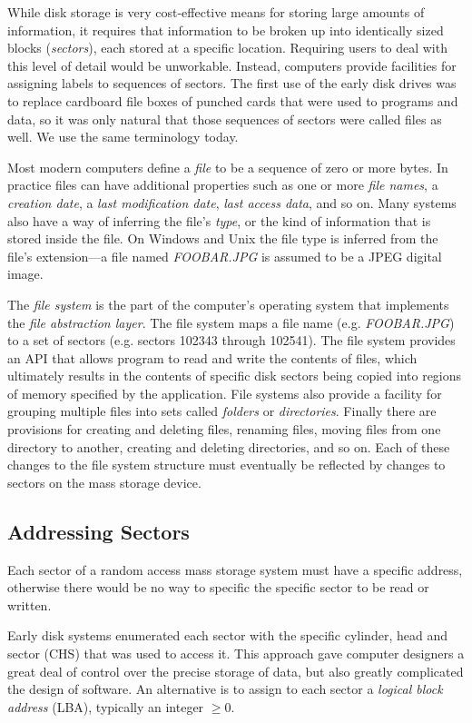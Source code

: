 While disk storage is very cost-effective means for storing large
amounts of information, it requires that information to be broken up
into identically sized blocks (\emph{sectors}), each stored at a
specific location. Requiring users to deal with this level of detail
would be unworkable. Instead, computers provide facilities for
assigning labels to sequences of sectors. The first use of the early
disk drives was to replace cardboard file boxes of punched cards that
were used to programs and data, so it was only natural that those
sequences of sectors were called files as well. We use the same
terminology today.

Most modern computers define a \emph{file} to be a sequence of zero or more
bytes. In practice files can have additional properties such as one or
more \emph{file names}, a \emph{creation date}, a \emph{last modification date},
\emph{last access data}, and so on. Many systems also have a way of
inferring the file's \emph{type}, or the kind of information that is
stored inside the file. On Windows and Unix  the file type is
inferred from the file's extension---a file named
\emph{FOOBAR.JPG} is assumed to be a JPEG digital image.

The \emph{file system} is the part of the computer's operating system
that implements the \emph{file abstraction layer}. The file
system maps a file name (e.g. \emph{FOOBAR.JPG}) to a set of
sectors (e.g. sectors 102343 through 102541). The file system provides
an API that allows program to read and write the contents of
files, which ultimately results in the contents of specific disk sectors being
copied into regions of memory specified by the application. File
systems also provide a
facility for grouping multiple files into sets called \emph{folders}
or \emph{directories}. Finally there are provisions for creating and deleting files, renaming
files, moving files from one directory to another, creating and
deleting directories, and so on. Each of these changes to the file
system structure must eventually be reflected by changes to sectors on
the mass storage device.


\subsection{Addressing Sectors}
Each sector of a random access mass storage system must have a
specific address, otherwise there would be no way to specific the
specific sector to be read or written.

Early disk systems enumerated each sector with the specific cylinder,
head and sector (CHS) that was used to access it. This approach gave
computer designers a great deal of control over the precise storage of
data, but also greatly complicated the design of software. An
alternative is to assign to each sector a \emph{logical block address}
(LBA), typically an integer $\ge0$.


